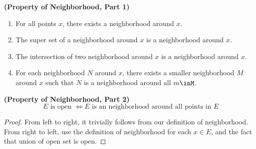 \documentclass{report}
\begin{document}
\begin{corollary}
\label{2.1.7}
\textbf{(Property of Neighborhood, Part 1)} 
\begin{enumerate}[label=(\alph*)]
  \item For all points $x$, there exists a neighborhood around $x$.\\
  \item The super set of a neighborhood around  $x$ is a neighborhood around $x$.\\
  \item The intersection of two neighborhood around  $x$ is a neighborhood around $x$.\\
  \item 
For each neighborhood $N$ around $x$, there exists a smaller neighborhood $M$ around $x$ such that  $N$ is a neighborhood around all $m \inM$.
\end{enumerate}
\end{corollary}
\begin{theorem}
\label{2.1.8}
\textbf{(Property of Neighborhood, Part 2)} 
\begin{equation}
  \text{ $E$ is open $\iff E$ is an neighborhood around all points in $E$}
\end{equation}
\end{theorem}
\begin{proof}
From left to right, it trivially follows from our definition of neighborhood.\\

From right to left, use the definition of neighborhood for each $x\in E$, and the fact that union of open set is open. 
\end{proof}
\end{document}
